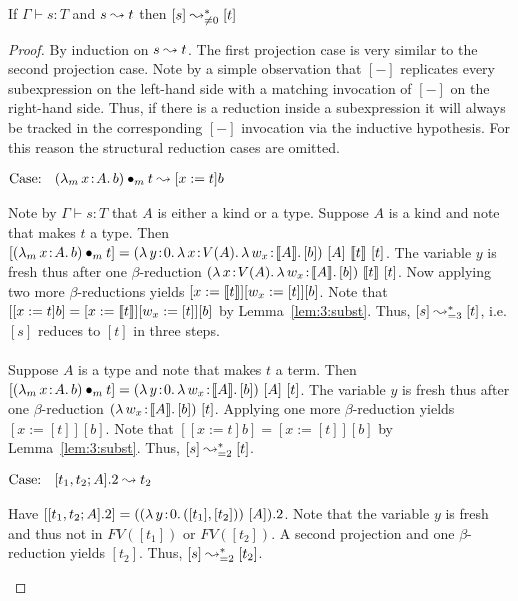 \begin{lemma}
    \label{lem:3:reduction_bounded}
    If $\Gamma \vdash s : T$ and $s \leadsto t$ then $[s] \leadsto^*_{\neq 0} [t]$
\end{lemma}
\begin{proof}
    By induction on $s \leadsto t$.
    The first projection case is very similar to the second projection case.
    Note by a simple observation that $[-]$ replicates every subexpression on the left-hand side with a matching invocation of $[-]$ on the right-hand side.
    Thus, if there is a reduction inside a subexpression it will always be tracked in the corresponding $[-]$ invocation via the inductive hypothesis.
    For this reason the structural reduction cases are omitted.

    $\text{Case: }\begin{array}{c} ({\lambda_m}\, x\! : \! A.\, b) \bullet_{m} t \leadsto [x := t]b \end{array}$
    \begin{proofcase}
        Note by $\Gamma \vdash s : T$ that $A$ is either a kind or a type.
        Suppose $A$ is a kind and note that makes $t$ a type.
        Then $[\app{(\abs{\lambda_m}{x}{A}{b})}{m}{t}] = (\abs{\lambda}{y}{0}{\abs{\lambda}{x}{V(A)}{\abs{\lambda}{w_x}{\sema{A}}{[b]}}}) \ [A]\ \sema{t}\ [t]$.
        The variable $y$ is fresh thus after one $\beta$-reduction $(\abs{\lambda}{x}{V(A)}{\abs{\lambda}{w_x}{\sema{A}}{[b]}})\ \sema{t}\ [t]$.
        Now applying two more $\beta$-reductions yields $[x := \llbracket t \rrbracket][w_x := [t]][b]$.
        Note that $[[x := t]b] = [x := \llbracket t \rrbracket][w_x := [t]][b]$ by Lemma~\ref{lem:3:subst}.
        Thus, $[s] \leadsto^*_{=3} [t]$, i.e. $[s]$ reduces to $[t]$ in three steps.
        \\ \\
        Suppose $A$ is a type and note that makes $t$ a term.
        Then $[\app{(\abs{\lambda_m}{x}{A}{b})}{m}{t}] = (\abs{\lambda}{y}{0}{\abs{\lambda}{w_x}{\sema{A}}{[b]}}) \ [A]\ [t]$.
        The variable $y$ is fresh thus after one $\beta$-reduction $(\abs{\lambda}{w_x}{\sema{A}}{[b]})\ [t]$.
        Applying one more $\beta$-reduction yields $[x := [t]][b]$.
        Note that $[[x := t]b] = [x := [t]][b]$ by Lemma~\ref{lem:3:subst}.
        Thus, $[s] \leadsto^*_{=2} [t]$.
    \end{proofcase}

    $\text{Case: }\begin{array}{c} [t_1, t_2; A].2 \leadsto t_2 \end{array}$
    \begin{proofcase}
        Have $[[t_1, t_2; A].2] = (({\lambda}\, y\! : \! 0.\, ([t_1], [t_2]))\ [A]).2$.
        Note that the variable $y$ is fresh and thus not in $FV([t_1])$ or $FV([t_2])$.
        A second projection and one $\beta$-reduction yields $[t_2]$.
        Thus, $[s] \leadsto^*_{=2} [t_2]$.
    \end{proofcase}
    

\end{proof}
